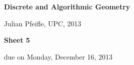 \documentclass[11pt]{amsart}
\begin{document}
\begin{center}
\textbf{\sffamily
   Discrete and Algorithmic Geometry }

\medskip
   Julian Pfeifle,
   UPC, 2013 \mbox{}
\end{center}

\bigskip

\begin{center}
  \textbf{\sffamily Sheet 5}

\bigskip
 due on Monday, December 16, 2013

\end{center}

\bigskip



\end{document}
